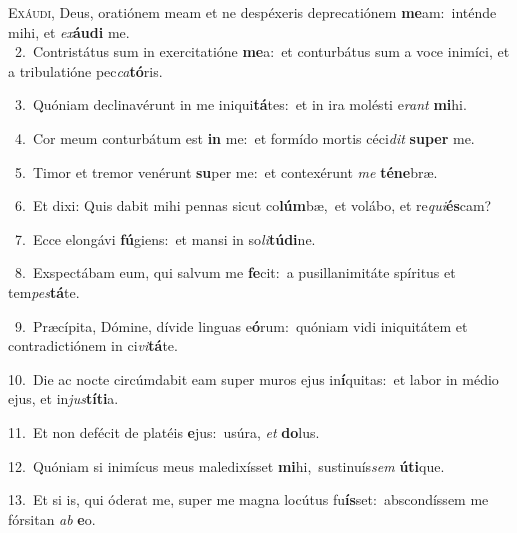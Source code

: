 \lettrine{\initial\textcolor{\initialcolor}{E}}{xáudi,} Deus, oratiónem meam et ne despéxeris deprecatiónem \textbf{me}\-am:~\star inténde mihi, et \textit{ex}\-\textbf{áu}\textbf{di} me.\\
{\numbfont\textcolor{\numbcolor}{~2.}}~Contristátus sum in exercitatióne \textbf{me}\-a:~\star et conturbátus sum a voce inimíci, et a tribulatióne pec\-\textit{ca}\-\textbf{tó}ris.\par
{\numbfont\textcolor{\numbcolor}{~3.}}~Quóniam declinavérunt in me iniqui\-\textbf{tá}\-tes:~\star et in ira molésti e\textit{rant} \textbf{mi}\-hi.\par
{\numbfont\textcolor{\numbcolor}{~4.}}~Cor meum conturbátum est \textbf{in} me:~\star et formído mortis céci\textit{dit} \textbf{su}\-\textbf{per} me.\par
{\numbfont\textcolor{\numbcolor}{~5.}}~Timor et tremor venérunt \textbf{su}\-per me:~\star et contexérunt \textit{me} \textbf{té}\-\textbf{ne}bræ.\par
{\numbfont\textcolor{\numbcolor}{~6.}}~Et dixi: Quis dabit mihi pennas sicut co\-\textbf{lúm}\-bæ,~\star et volábo, et re\-\textit{qui}\-\textbf{és}cam?\par
{\numbfont\textcolor{\numbcolor}{~7.}}~Ecce elongávi \textbf{fú}\-giens:~\star et mansi in so\-\textit{li}\-\textbf{tú}\textbf{di}ne.\par
{\numbfont\textcolor{\numbcolor}{~8.}}~Exspectábam eum, qui salvum me \textbf{fe}\-cit:~\star a pusillanimitáte spíritus et tem\-\textit{pes}\-\textbf{tá}te.\par
{\numbfont\textcolor{\numbcolor}{~9.}}~Præcípita, Dómine, dívide linguas e\-\textbf{ó}\-rum:~\star quóniam vidi iniquitátem et contradictiónem in ci\-\textit{vi}\-\textbf{tá}te.\par
{\numbfont\textcolor{\numbcolor}{10.}}~Die ac nocte circúmdabit eam super muros ejus in\-\textbf{í}\-quitas:~\star et labor in médio ejus, et in\-\textit{jus}\-\textbf{tí}\textbf{ti}a.\par
{\numbfont\textcolor{\numbcolor}{11.}}~Et non defécit de platéis \textbf{e}\-jus:~\star usúra, \textit{et} \textbf{do}\-lus.\par
{\numbfont\textcolor{\numbcolor}{12.}}~Quóniam si inimícus meus maledixísset \textbf{mi}\-hi,~\star sustinuís\textit{sem} \textbf{ú}\-\textbf{ti}que.\par
{\numbfont\textcolor{\numbcolor}{13.}}~Et si is, qui óderat me, super me magna locútus fu\-\textbf{ís}\-set:~\star abscondíssem me fórsitan \textit{ab} \textbf{e}\-o.\par
